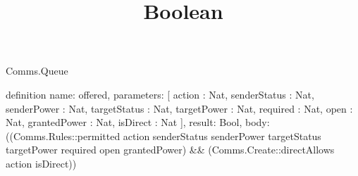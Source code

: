 \begin{lexlean}{Comms.Queue}
\title{Boolean}
\begin{semanticmodule}
definition{
  name: offered,
  parameters: [
    action : Nat,
    senderStatus : Nat,
    senderPower : Nat,
    targetStatus : Nat,
    targetPower : Nat,
    required : Nat,
    open : Nat,
    grantedPower : Nat,
    isDirect : Nat
  ],
  result: Bool,
  body: ((Comms.Rules::permitted action senderStatus senderPower targetStatus targetPower required open grantedPower) && (Comms.Create::directAllows action isDirect))
}
\end{semanticmodule}
\end{lexlean}
